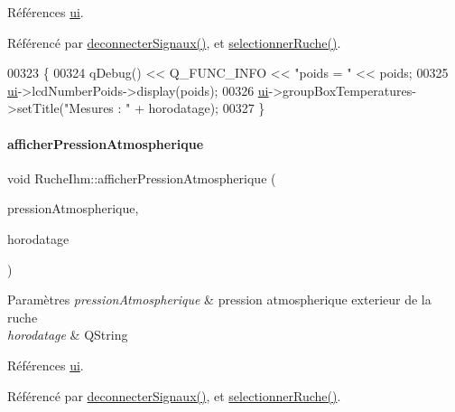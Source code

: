 Références \hyperlink{class_ruche_ihm_a64786058bd7f88ca2f1e9743bb27c25b}{ui}.



Référencé par \hyperlink{class_ruche_ihm_a348a76106f3072dd31a382c6025b8113}{deconnecter\+Signaux()}, et \hyperlink{class_ruche_ihm_a7324ae6ea574ccdad47783f466933157}{selectionner\+Ruche()}.


\begin{DoxyCode}
00323 \{
00324     qDebug() << Q\_FUNC\_INFO << \textcolor{stringliteral}{"poids = "} << poids;
00325     \hyperlink{class_ruche_ihm_a64786058bd7f88ca2f1e9743bb27c25b}{ui}->lcdNumberPoids->display(poids);
00326     \hyperlink{class_ruche_ihm_a64786058bd7f88ca2f1e9743bb27c25b}{ui}->groupBoxTemperatures->setTitle(\textcolor{stringliteral}{"Mesures : "} + horodatage);
00327 \}
\end{DoxyCode}
\mbox{\label{class_ruche_ihm_ab38e4be7a1f39c862d7d8ab2ed3de98e}} 
\paragraph{\texorpdfstring{afficher\+Pression\+Atmospherique}{afficherPressionAtmospherique}}
{\footnotesize\ttfamily void Ruche\+Ihm\+::afficher\+Pression\+Atmospherique (\begin{DoxyParamCaption}\item[{double}]{pression\+Atmospherique,  }\item[{Q\+String}]{horodatage }\end{DoxyParamCaption})\hspace{0.3cm}{\ttfamily [slot]}}


\begin{DoxyParams}{Paramètres}
{\em pression\+Atmospherique} & pression atmospherique exterieur de la ruche \\
\hline
{\em horodatage} & Q\+String \\
\hline
\end{DoxyParams}


Références \hyperlink{class_ruche_ihm_a64786058bd7f88ca2f1e9743bb27c25b}{ui}.



Référencé par \hyperlink{class_ruche_ihm_a348a76106f3072dd31a382c6025b8113}{deconnecter\+Signaux()}, et \hyperlink{class_ruche_ihm_a7324ae6ea574ccdad47783f466933157}{selectionner\+Ruche()}.


